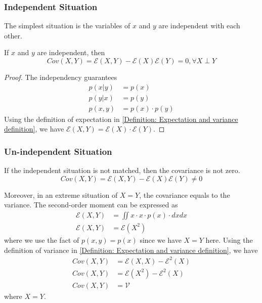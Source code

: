 \documentclass[../main.tex]{subfiles}
\begin{document}
\subsubsection{Independent Situation}

The simplest situation is the variables of $x$ and $y$ are independent with each other.
\begin{lemma}
    \label{Lemma: Mixed second-order moment of independent variables}
    If $x$ and $y$ are independent, then
    \begin{equation*}
        Cov(X, Y) =
        \mathcal{E}(X, Y) - \mathcal{E}(X) \mathcal{E}(Y) = 0,
        \forall X \perp Y
    \end{equation*}
    \begin{proof}
        The independency guarantees
        \begin{align*}
            p(x|y)  & = p(x)            \\
            p(y|x)  & = p(y)            \\
            p(x, y) & = p(x) \cdot p(y)
        \end{align*}
        Using the definition of expectation in \eqref{Definition: Expectation and variance definition},
        we have $\mathcal{E}(X, Y) = \mathcal{E}(X) \cdot \mathcal{E}(Y)$.
    \end{proof}
\end{lemma}

\subsubsection{Un-independent Situation}

If the independent situation is not matched, then the covariance is not zero.
\begin{equation*}
    Cov(X, Y) =
    \mathcal{E}(X, Y) - \mathcal{E}(X)\mathcal{E}(Y)
    \neq 0
\end{equation*}

Moreover, in an extreme situation of $X=Y$, the covariance equals to the variance.
The second-order moment can be expressed as
\begin{align*}
    \mathcal{E}(X, Y) & = \iint x \cdot x \cdot p(x) \cdot dx dx \\
    \mathcal{E}(X, Y) & = \mathcal{E}(X^2)
\end{align*}
where we use the fact of $p(x, y) = p(x)$ since we have $X=Y$ here.
Using the definition of variance in \eqref{Definition: Expectation and variance definition}, we have
\begin{align*}
    Cov(X, Y) & = \mathcal{E}(X, X) - \mathcal{E}^2(X) \\
    Cov(X, Y) & = \mathcal{E}(X^2) - \mathcal{E}^2(X)  \\
    Cov(X, Y) & = \mathcal{V}
\end{align*}
where $X=Y$.
\end{document}
